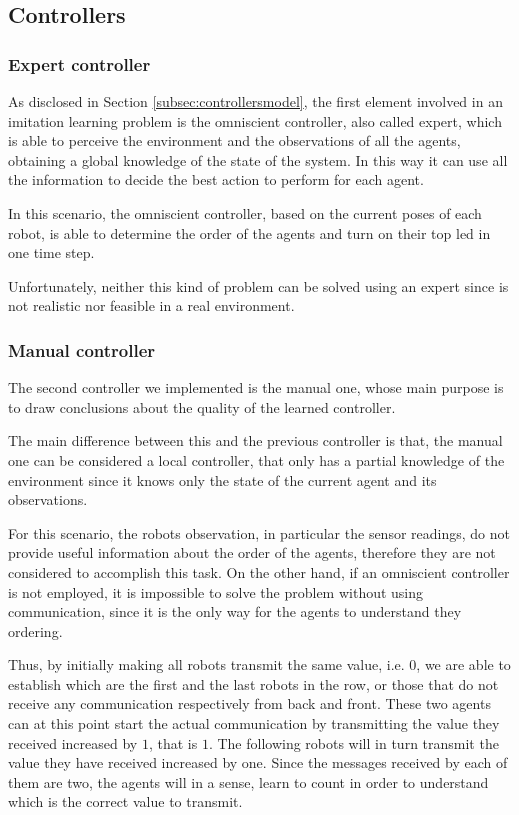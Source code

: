 \subsection{Controllers}
\label{subsec:task2controllers}

\subsubsection{Expert controller}
\label{subsubsec:omniscient2}

As disclosed in Section \ref{subsec:controllersmodel}, the first element involved in 
an imitation learning problem is the omniscient controller, also called expert, 
which is able to perceive the environment and the observations of all the agents, 
obtaining a global knowledge of the state of the system. In this way it can use all 
the information to decide the best action to perform for each agent.

In this scenario, the omniscient controller, based on the current poses of each 
robot, is able to determine the order of the agents and turn on their top \gls{led}  
in one time step.

Unfortunately, neither this kind of problem can be solved using an expert since is 
not realistic nor feasible in a real environment.

\subsubsection{Manual controller}
\label{subsubsec:manual2}

The second controller we implemented is the manual one, whose main 
purpose is to draw conclusions about the quality of the learned controller.

The main difference between this and the previous controller is that, the manual 
one can be considered a local controller, that only has a partial knowledge of the 
environment since it knows only the state of the current agent and its 
observations.

For this scenario, the robots observation, in particular the sensor readings, do not 
provide useful information about the order of the agents, therefore they are not 
considered to accomplish this task.
On the other hand, if an omniscient controller is not employed, it is impossible to 
solve the problem without using communication, since it is the only way for the 
agents to understand they ordering.

Thus, by initially making all robots transmit the same value, i.e. $0$, we are able 
to establish which are the first and the last robots in the row, or those that do not 
receive any communication respectively from back and front. 
These two agents can at this point start the actual communication by transmitting 
the value they received increased by $1$, that is $1$. 
The following robots will in turn transmit the value they have received increased 
by one. Since the messages received by each of them are two, the agents will in a 
sense, learn to count in order to understand which is the correct value to 
transmit.

